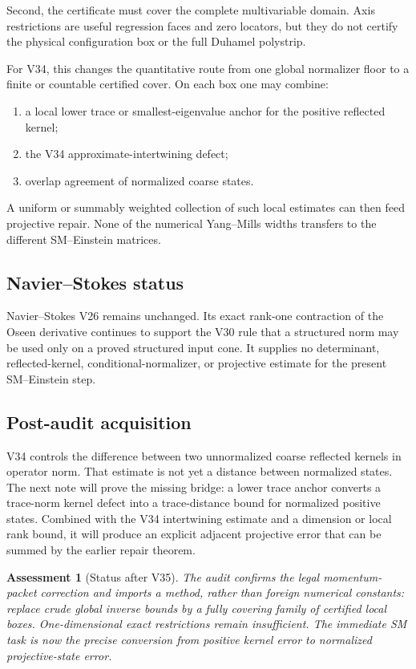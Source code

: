 \documentclass[11pt]{article}
\newtheorem{assessment}[theorem]{Assessment}
\theoremstyle{remark}
\begin{document}
Second, the certificate must cover the complete multivariable
domain.  Axis restrictions are useful regression faces and zero
locators, but they do not certify the physical configuration box or
the full Duhamel polystrip.

For V34, this changes the quantitative route from one global
normalizer floor to a finite or countable certified cover.  On each
box one may combine:
\begin{enumerate}
\item a local lower trace or smallest-eigenvalue anchor for the
positive reflected kernel;
\item the V34 approximate-intertwining defect;
\item overlap agreement of normalized coarse states.
\end{enumerate}
A uniform or summably weighted collection of such local estimates
can then feed projective repair.  None of the numerical Yang--Mills
widths transfers to the different SM--Einstein matrices.

\subsection{Navier--Stokes status}

Navier--Stokes V26 remains unchanged.  Its exact rank-one contraction
of the Oseen derivative continues to support the V30 rule that a
structured norm may be used only on a proved structured input cone.
It supplies no determinant, reflected-kernel, conditional-normalizer,
or projective estimate for the present SM--Einstein step.

\subsection{Post-audit acquisition}

V34 controls the difference between two unnormalized coarse
reflected kernels in operator norm.  That estimate is not yet a
distance between normalized states.  The next note will prove the
missing bridge: a lower trace anchor converts a trace-norm kernel
defect into a trace-distance bound for normalized positive states.
Combined with the V34 intertwining estimate and a dimension or local
rank bound, it will produce an explicit adjacent projective error
that can be summed by the earlier repair theorem.

\begin{assessment}[Status after V35]
\label{ass:v12v35-status}
The audit confirms the legal momentum-packet correction and imports
a method, rather than foreign numerical constants: replace crude
global inverse bounds by a fully covering family of certified local
boxes.  One-dimensional exact restrictions remain insufficient.
The immediate SM task is now the precise conversion from positive
kernel error to normalized projective-state error.
\end{assessment}
\end{document}
